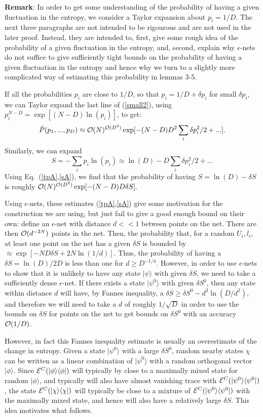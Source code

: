 \documentclass[aps,prl,amsmath,amssymb,amsfonts,superscriptaddress,floatfix]{revtex4}
\newcommand{\conc}{{\cal E}^C}
\newcommand{\be}{\begin{equation}}
\newcommand{\ee}{\end{equation}}
\begin{document}
{\bf Remark}:
In order to get some understanding of the probability of having
a given fluctuation in the entropy, we consider a Taylor expansion
about $p_i=1/D$.  The next three paragraphs are not intended
to be rigourous and are not used in the later proof.
Instead, they are intended to, first, give some
rough idea of the probability of a given fluctuation in the entropy,
and, second, explain why $\epsilon$-nets do not suffice to give sufficiently
tight bounds on the probability of having a given fluctuation in the
entropy and hence why we turn to a slightly more complicated way of
estimating this probability in lemmas 3-5.

If all the probabilities $p_i$ are close to $1/D$, so that $p_i=1/D+\delta p_i$ for
small $\delta p_i$, we can 
Taylor expand the last
line of (\ref{small2}),
using $p_i^{N-D}=\exp[(N-D)\ln(p_i)]$, to get:
\be
\label{tpA}
\tilde P(p_1,...,p_D)\approx
{\cal O}(N)^{{\cal O}(D^2)} \exp[-(N-D) D^2 \sum_i \delta p_i^2/2+...].
\ee
Similarly, we can expand
\be
\label{sA}
S=-\sum_i p_i \ln(p_i) \approx \ln(D)-D \sum_i \delta p_i^2/2+...
\ee
Using Eq.~(\ref{tpA},\ref{sA}), we find that the probability of having
$S=\ln(D)-\delta S$ is roughly 
${\cal O}(N)^{{\cal O}(D^2)} \exp[-(N-D) D \delta S]$.

Using $\epsilon$-nets, these estimates (\ref{tpA},\ref{sA}) give
some motivation for the construction we are using, but just fail to
give a good enough bound on their own: define an $\epsilon$-net with
distance $d<<1$ between points on the net.  There are then ${\cal O}(d^{-2N})$
points in the net.  Then, the probability
that, for a random $U_i,l_i$, 
at least one point on the net has a given $\delta S$ is bounded by
$\approx\exp[-N D \delta S+2N \ln(1/d)]$.  Thus, the probability
of having a $\delta S=\ln(D)/2D$ is less than one for
$d\geq D^{-1/4}$.  However, in order to use $\epsilon$-nets to show
that it is unlikely to have any state $|\psi\rangle$ with given
$\delta S$, we need to take a sufficiently dense $\epsilon$-net.
If there exists a state $|\psi^0\rangle$ with given
$\delta S^0$, then any state within distance $d$ will have,
by Fannes inequality\cite{fannes}, a $\delta S\geq \delta S^0-d^2 \ln(D/d^2)$,
and therefore we will need to take a $d$ of roughly $1/\sqrt{D}$
in order to use the
bounds on $\delta S$ for points on the net to
get bounds on $\delta S^0$ with an accuracy
${\cal O}(1/D)$.
 

However,
in fact this Fannes inequality estimate is usually an overestimate of
the change in entropy.  Given a state $|\psi^0\rangle$ with
a large $\delta S^0$, random nearby states $\chi$ can be written as
a linear combination of $|\psi^0\rangle$ with a random
orthogonal vector $|\phi\rangle$.  Since $\conc(|\phi\rangle\langle\phi|)$ will
typically by close to a maximally mixed state for
random $|\phi\rangle$, and
typically will also have almost vanishing trace with $\conc(|\psi^0\rangle\langle\psi^0|)$,
the state $\conc(|\chi\rangle\langle\chi|)$ will typically be close to a mixture
of 
$\conc(|\psi^0\rangle\langle\psi^0|)$ with the maximally mixed state, and
hence will also have a relatively large $\delta S$.  This idea motivates
what follows.
\end{document}
